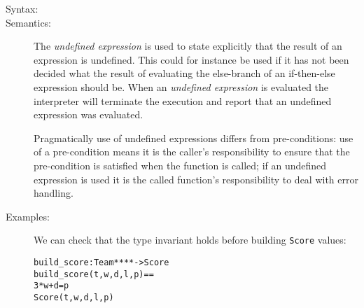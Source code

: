 \documentclass[\pformat,12pt]{article}
\begin{document}
\begin{description}
\item[Syntax:]

  
\item[Semantics:] The {\it undefined expression} is used to state
  explicitly that the result of an expression is undefined. This could
  for instance be used if it has not been decided what the result of
  evaluating the else-branch of an if-then-else expression should be.
  When an {\it undefined expression} is evaluated the
  interpreter will terminate the execution
  and report that an undefined expression was evaluated.

  Pragmatically use of undefined expressions differs from
  pre-conditions: use of a pre-condition means it is the caller's
  responsibility to ensure that the pre-condition is satisfied when
  the function is called; if an undefined expression is used it is the
  called function's responsibility to deal with error handling.

\item[Examples:] We can check that the type invariant holds before building 
  \texttt{Score} values:
  \begin{alltt}
  build_score : Team *  *  *  *  -> Score
  build_score (t,w,d,l,p) ==
     3 * w + d = p
     Score(t,w,d,l,p)
  \end{alltt}
\end{description}
\end{document}
